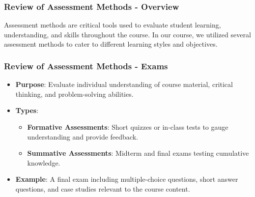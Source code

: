 \documentclass{beamer}
\begin{document}
\begin{frame}[fragile]
    \frametitle{Review of Assessment Methods - Overview}
    Assessment methods are critical tools used to evaluate student learning, understanding, and skills throughout the course. In our course, we utilized several assessment methods to cater to different learning styles and objectives.
\end{frame}

\begin{frame}[fragile]
    \frametitle{Review of Assessment Methods - Exams}
    \begin{itemize}
        \item \textbf{Purpose}: Evaluate individual understanding of course material, critical thinking, and problem-solving abilities.
        \item \textbf{Types}:
            \begin{itemize}
                \item \textbf{Formative Assessments}: Short quizzes or in-class tests to gauge understanding and provide feedback.
                \item \textbf{Summative Assessments}: Midterm and final exams testing cumulative knowledge.
            \end{itemize}
        \item \textbf{Example}: A final exam including multiple-choice questions, short answer questions, and case studies relevant to the course content.
    \end{itemize}
\end{frame}
\end{document}
